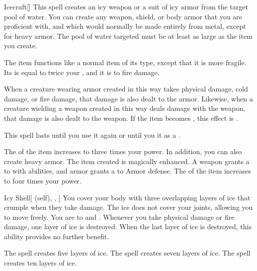 \lowercase{\hypertarget{spell:Icecraft}{}}\label{spell:Icecraft}
\begin{freeability}[Rank 1]{\hypertarget{spell:Icecraft}{Icecraft}}[]
This spell creates an icy weapon or a suit of icy armor from the target pool of water.
You can create any weapon, shield, or body armor that you are proficient with, and which would normally be made entirely from metal, except for heavy armor.
The pool of water targeted must be at least as large as the item you create.

The item functions like a normal item of its type, except that it is more fragile.
Its  is equal to twice your , and it is  to fire damage.

When a creature wearing armor created in this way takes physical damage, cold damage, or fire damage, that damage is also dealt to the armor.
Likewise, when a creature wielding a weapon created in this way deals damage with the weapon, that damage is also dealt to the weapon.
If the item becomes , this effect is .

This spell lasts until you use it again or until you  it as a .

\rankline
{} The  of the item increases to three times your power.
In addition, you can also create heavy armor.
 The item created is magically enhanced.
A weapon grants a   to  with  abilities,
and armor grants a   to Armor defense.
 The  of the item increases to four times your power.
\end{freeability}
\vspace{0.25em}



\lowercase{\hypertarget{spell:Icy Shell}{}}\label{spell:Icy Shell}
\begin{attuneability}[Rank 1]{\hypertarget{spell:Icy Shell}{Icy Shell}}[ (self), , ]
You cover your body with three overlapping layers of ice that crumple when they take damage.
The ice does not cover your joints, allowing you to move freely.
You are  to  and .
Whenever you take physical damage or fire damage, one layer of ice is destroyed.
When the last layer of ice is destroyed, this ability provides no further benefit.

\rankline
{} The spell creates five layers of ice.
 The spell creates seven layers of ice.
 The spell creates ten layers of ice.
\end{attuneability}
\vspace{0.25em}




